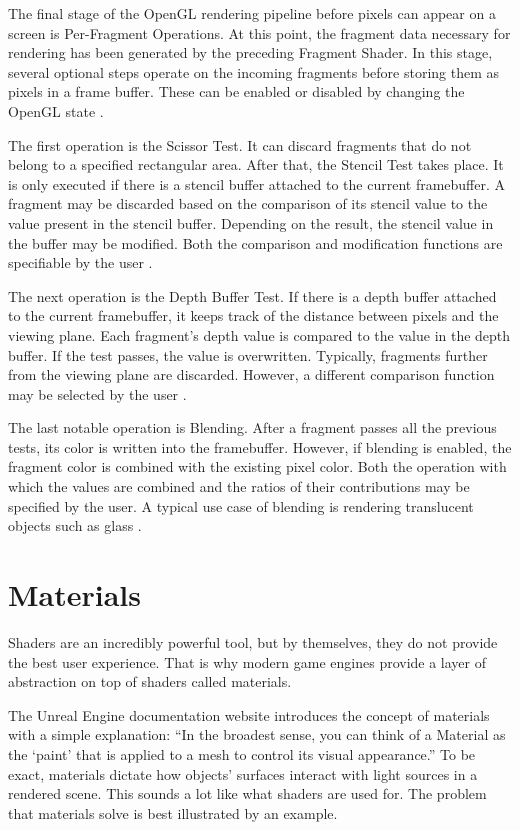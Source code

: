 \documentclass[
  digital,     %
  oneside,     %
  nosansbold,  %
  nocolorbold, %
  lof,         %
  lot,         %
]{fithesis4}
\begin{document}
The final stage of the OpenGL rendering pipeline before pixels can appear on a screen is Per-Fragment Operations.
At this point, the fragment data necessary for
rendering has been generated by the preceding Fragment Shader. In this stage, several optional steps operate
on the incoming fragments before storing them as pixels in a frame buffer.
These can be enabled or disabled by changing the OpenGL state \cite[p.46]{opengl-superbible}.

The first operation is the Scissor Test. It can discard fragments that do not belong to a specified rectangular area.
After that, the Stencil Test takes place. It is only executed if there is a stencil buffer attached to
the current framebuffer. A fragment may be discarded based on the comparison of its stencil value
to the value present in the stencil buffer. Depending on the result, the stencil value in the buffer
may be modified. Both the comparison and modification functions are specifiable by the user
\cite[p.504-506]{opengl-book}.

The next operation is the Depth Buffer Test. If there is a depth buffer attached to the current framebuffer,
it keeps track of the distance between pixels and the viewing plane. Each fragment's depth value
is compared to the value in the depth buffer. If the test passes, the value is overwritten.
Typically, fragments further from the viewing plane are discarded. However,
a different comparison function may be selected by the user \cite[p.510]{opengl-book}.

The last notable operation is Blending. After a fragment passes all the previous tests,
its color is written into the framebuffer. However, if blending is enabled,
the fragment color is combined with the existing pixel color.
Both the operation with which the values are combined and the ratios of their contributions
may be specified by the user. A typical use case of blending is rendering translucent objects such as glass \cite[p.251-256]{opengl-book}.

\chapter{Materials}\label{chap:materials}
Shaders are an incredibly powerful tool, but by themselves, they do not provide the best user experience.
That is why modern game engines provide a layer of abstraction on top of shaders called materials.

The Unreal Engine documentation website \cite{ue-materials} introduces the concept of materials with
a simple explanation: \enquote{In the broadest sense, you can think of a Material as the \enquote{paint} that is applied to a mesh
to control its visual appearance.} To be exact, materials dictate how objects' surfaces interact with light sources
in a rendered scene. This sounds a lot like what shaders are used for. The problem that materials solve is best illustrated
by an example.
\end{document}
